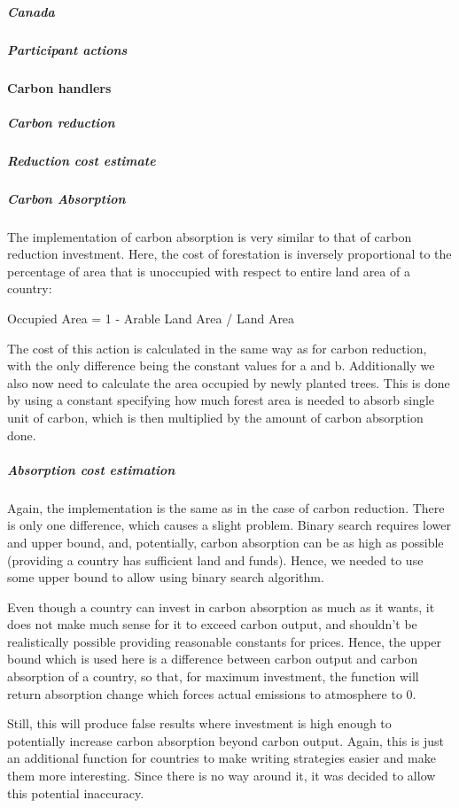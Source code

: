 \subparagraph{Canada}

%
%

\subparagraph{Participant actions}

\paragraph{Carbon handlers}

\subparagraph{Carbon reduction}

\subparagraph{Reduction cost estimate}

\subparagraph{Carbon Absorption}

The implementation of carbon absorption is very similar to that of carbon reduction investment. Here, the cost of forestation is inversely proportional to the percentage of area that is unoccupied with respect to entire land area of a country:

\begin{center}
Occupied Area = 1 - Arable Land Area / Land Area
\end{center}

The cost of this action is calculated in the same way as for carbon reduction, with the only difference being the constant values for a and b. Additionally we also now need to calculate the area occupied by newly planted trees. This is done by using a constant specifying how much forest area is needed to absorb single unit of carbon, which is then multiplied by the amount of carbon absorption done.

\subparagraph{Absorption cost estimation}

Again, the implementation is the same as in the case of carbon reduction. There is only one difference, which causes a slight problem. Binary search requires lower and upper bound, and, potentially, carbon absorption can be as high as possible (providing a country has sufficient land and funds). Hence, we needed to use some upper bound to allow using binary search algorithm.

Even though a country can invest in carbon absorption as much as it wants, it does not make much sense for it to exceed carbon output, and shouldn't be realistically possible providing reasonable constants for prices. Hence, the upper bound which is used here is a difference between carbon output and carbon absorption of a country, so that, for maximum investment, the function will return absorption change which forces actual emissions to atmosphere to 0.

Still, this will produce false results where investment is high enough to potentially increase carbon absorption beyond carbon output. Again, this is just an additional function for countries to make writing strategies easier and make them more interesting. Since there is no way around it, it was decided to allow this potential inaccuracy.

